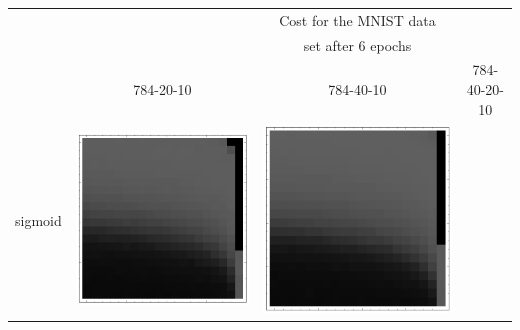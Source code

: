 \documentclass[10pt]{article}
\begin{document}
\begin{tabular}{|c|c|c|c|}
        \hline
        & & Cost for the MNIST data & \\
        & & set after 6 epochs & \\
        \hline
         & 784-20-10 & 784-40-10 & 784-40-20-10\\ \hline
sigmoid 
        & \includegraphics[scale=0.25]{plots/simple/LF-20S10S-20T10-MNIST-6.png}
        & \includegraphics[scale=0.25]{plots/simple/LF-40S10S-20T10-MNIST-6.png}

\end{tabular}
\end{document}

